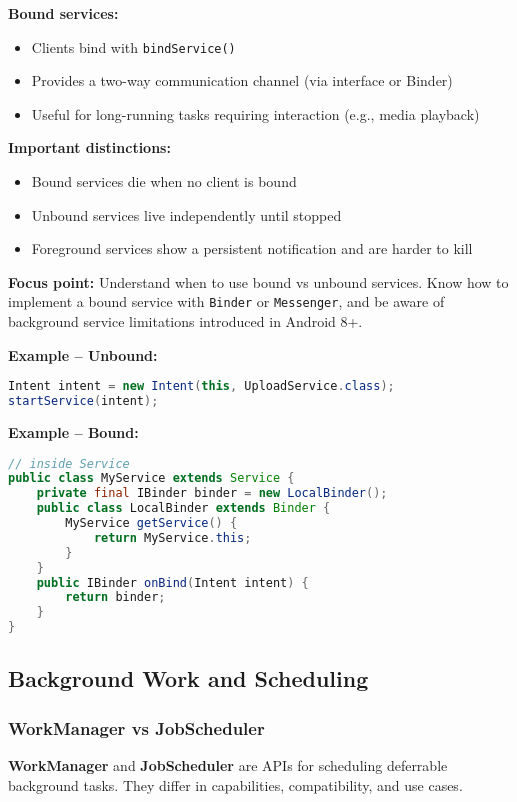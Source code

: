 \documentclass[a4paper,12pt]{article}
\begin{document}
\textbf{Bound services:}
\begin{itemize}
  \item Clients bind with \texttt{bindService()}
  \item Provides a two-way communication channel (via interface or Binder)
  \item Useful for long-running tasks requiring interaction (e.g., media playback)
\end{itemize}

\textbf{Important distinctions:}
\begin{itemize}
  \item Bound services die when no client is bound
  \item Unbound services live independently until stopped
  \item Foreground services show a persistent notification and are harder to kill
\end{itemize}

\textbf{Focus point:} Understand when to use bound vs unbound services. Know how to implement a bound service with \texttt{Binder} or \texttt{Messenger}, and be aware of background service limitations introduced in Android 8+.

\textbf{Example – Unbound:}
\begin{lstlisting}[language=Java]
Intent intent = new Intent(this, UploadService.class);
startService(intent);
\end{lstlisting}

\textbf{Example – Bound:}
\begin{lstlisting}[language=Java]
// inside Service
public class MyService extends Service {
    private final IBinder binder = new LocalBinder();
    public class LocalBinder extends Binder {
        MyService getService() {
            return MyService.this;
        }
    }
    public IBinder onBind(Intent intent) {
        return binder;
    }
}
\end{lstlisting}

\subsection{Background Work and Scheduling}

\subsubsection{WorkManager vs JobScheduler}

\textbf{WorkManager} and \textbf{JobScheduler} are APIs for scheduling deferrable background tasks. They differ in capabilities, compatibility, and use cases.
\end{document}
